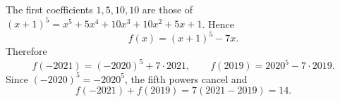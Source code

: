 The first coefficients $1,5,10,10$ are those of $(x+1)^5=x^5+5x^4+10x^3+10x^2+5x+1$. Hence
\[f(x)=(x+1)^5-7x .\]
Therefore
\[f(-2021)=(-2020)^5+7\cdot2021,\qquad f(2019)=2020^5-7\cdot2019 .\]
Since $(-2020)^5=-2020^5$, the fifth powers cancel and
\[f(-2021)+f(2019)=7(2021-2019)=\boxed{14}.\]
